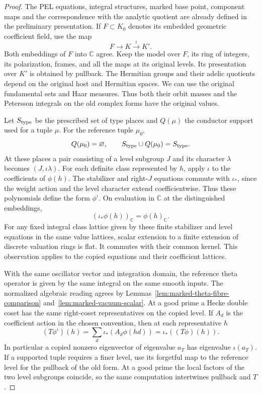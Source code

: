 \begin{proof}
The PEL equations, integral structures, marked base point, component
maps and the correspondence with the analytic quotient are already
defined in the preliminary presentation. If \(F\subset K_0\)
denotes its embedded geometric coefficient field, use the map
\[
                 F\longrightarrow K\xrightarrow{\iota}K'.
\]
Both embeddings of \(F\) into \(\mathbb C\) agree. Keep the
model over \(F\), its ring of integers, its polarization, frames,
and all the maps at its original levels. Its presentation over
\(K'\) is obtained by pullback. The Hermitian groups and their
adelic quotients depend on the original host and Hermitian
spaces. We can use the original fundamental sets and Haar measures.
Thus both their orbit masses and the Petersson integrals on the
old complex forms have the original values.

Let \(S_{\rm type}\) be the prescribed set of type places and
\(Q(\mu)\) the conductor support used for a tuple \(\mu\).
For the reference tuple \(\mu_0\),
\[
              Q(\mu_0)=\varnothing,\qquad
              S_{\rm type}\cup Q(\mu_0)=S_{\rm type}.
\]
At these places a pair consisting of a level subgroup \(J\) and
its character \(\lambda\) becomes \((J,\iota\lambda)\).
For each definite class represented by \(h\), apply \(\iota\)
to the coefficients of \(\phi(h)\). The stabilizer and
right-\(J\) equations commute with \(\iota_*\), since the
weight action and the level character extend coefficientwise.
Thus these polynomials define the form \(\phi^\iota\). On
evaluation in \(\mathbb C\) at the distinguished embeddings,
\[
              (\iota_*\phi(h))_{\mathbb C}=\phi(h)_{\mathbb C}.
\]
For any fixed integral class lattice given by these finite
stabilizer and level equations in the same value lattices, scalar
extension to a finite extension of discrete valuation rings is
flat. It commutes with their common kernel. This observation
applies to the copied equations and their coefficient lattices.

With the same oscillator vector and integration domain, the
reference theta operator is given by the same integral on the
same smooth inputs. The normalized algebraic reading agrees by
Lemmas~\ref{lem:marked-theta-fibre-comparison}
and~\ref{lem:marked-vacuum-scalar}. At a good prime a Hecke
double coset has the same right-coset representatives on the
copied level. If \(A_d\) is the coefficient action in the
chosen convention, then at each representative \(h\)
\[
 (T\phi^\iota)(h)
   =\sum_d \iota_*(A_d\phi(hd))
   =\iota_*\!\left((T\phi)(h)\right).
\]
In particular a copied nonzero eigenvector of eigenvalue \(a_T\)
has eigenvalue \(\iota(a_T)\). If a supported tuple requires a
finer level, use its forgetful map to the reference level for
the pullback of the old form. At a good prime the local factors
of the two level subgroups coincide, so the same computation
intertwines pullback and \(T\).


\end{proof}
